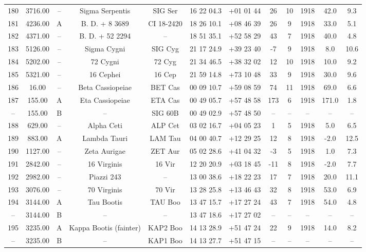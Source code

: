 \begin{table}
\begin{tabular}{cccccccccccc}
180 & 3716.00 & -- & Sigma Serpentis & SIG Ser & 16 22 04.3 & +01 01 44 & 26 & 10 & 1918 & 42.0 & 9.3 \\
181 & 4236.00 & A & B. D. + 8  3689 & CI 18-2420 & 18 26 10.1 & +08 46 39 & 26 & 9 & 1918 & 33.0 & 5.1 \\
182 & 4371.00 & -- & B. D. + 52  2294 & -- & 18 51 35.1 & +52 58 29 & 43 & 7 & 1918 & 40.0 & 4.8 \\
183 & 5126.00 & -- & Sigma Cygni & SIG Cyg & 21 17 24.9 & +39 23 40 & -7 & 9 & 1918 & 8.0 & 10.6 \\
184 & 5202.00 & -- & 72 Cygni & 72 Cyg & 21 34 46.5 & +38 32 02 & 12 & 10 & 1918 & 10.0 & 9.2 \\
185 & 5321.00 & -- & 16 Cephei & 16 Cep & 21 59 14.8 & +73 10 48 & 33 & 9 & 1918 & 30.0 & 9.6 \\
186 & 16.00 & -- & Beta Cassiopeiae & BET Cas & 00 09 10.7 & +59 08 59 & 74 & 11 & 1918 & 69.0 & 6.6 \\
187 & 155.00 & A & Eta Cassiopeiae & ETA Cas & 00 49 05.7 & +57 48 58 & 173 & 6 & 1918 & 171.0 & 1.8 \\
-- & 155.00 & B & -- & SIG 60B & 00 49 02.9 & +57 48 50 & -- & -- & -- & -- & -- \\
188 & 629.00 & -- & Alpha Ceti & ALP Cet & 03 02 16.7 & +04 05 23 & 1 & 5 & 1918 & 5.0 & 6.5 \\
189 & 883.00 & A & Lambda Tauri & LAM Tau & 04 00 40.7 & +12 29 25 & 12 & 8 & 1918 & -2.0 & 12.5 \\
190 & 1127.00 & -- & Zeta Aurigae & ZET Aur & 05 02 28.6 & +41 04 32 & -3 & 5 & 1918 & 1.0 & 7.3 \\
191 & 2842.00 & -- & 16 Virginis & 16 Vir & 12 20 20.9 & +03 18 45 & -11 & 8 & 1918 & -2.0 & 7.7 \\
192 & 2982.00 & -- & Piazzi 243 & -- & 13 00 38.6 & +18 22 23 & 17 & 7 & 1918 & 20.0 & 11.1 \\
193 & 3076.00 & -- & 70 Virginis & 70 Vir & 13 28 25.8 & +13 46 43 & 32 & 8 & 1918 & 53.0 & 6.9 \\
194 & 3144.00 & A & Tau Bootis & TAU Boo & 13 47 15.7 & +17 27 24 & 43 & 7 & 1918 & 54.0 & 4.8 \\
-- & 3144.00 & B & -- & -- & 13 47 18.6 & +17 27 02 & -- & -- & -- & -- & -- \\
195 & 3235.00 & A & Kappa Bootis (fainter) & KAP2 Boo & 14 13 28.9 & +51 47 24 & 22 & 9 & 1918 & 14.0 & 8.2 \\
-- & 3235.00 & B & -- & KAP1 Boo & 14 13 27.7 & +51 47 15 & -- & -- & -- & -- & -- \\

\end{tabular}
\end{table}
